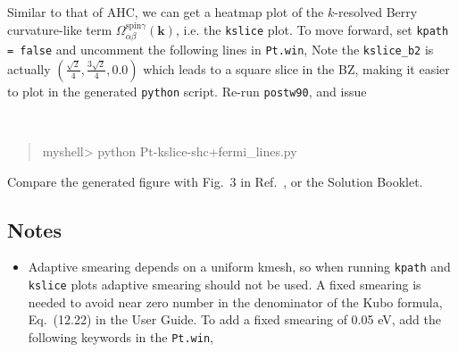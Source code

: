 \documentclass[a4paper,11pt,twoside]{article}
\begin{document}
Similar to that of AHC, we can get a heatmap plot of 
the $k$-resolved Berry curvature-like term 
$\Omega_{\alpha\beta}^{\text{spin}\gamma}({\bm k})$, 
i.e. the {\tt kslice} plot. To move forward, 
set {\tt kpath = false} and uncomment the following lines in {\tt Pt.win},
%
Note the {\tt kslice\_b2} is actually $(\frac{\sqrt{2}}{4},   \frac{3\sqrt{2}}{4},0.0)$ which leads to a square slice in the BZ, 
making it easier to plot in the generated {\tt python} script. 
Re-run {\tt postw90}, and issue%
{\tt
	\begin{quote}
		myshell> python Pt-kslice-shc+fermi\_lines.py
\end{quote} }
\medskip
%
Compare the generated figure with Fig.~3 in Ref.~\cite{qiao-prb2018}, or 
the Solution Booklet. 

\subsection*{Notes}
%
\begin{itemize}
\item Adaptive smearing depends on a uniform kmesh, so when running 
{\tt kpath} and {\tt kslice} plots adaptive smearing should not be 
used. A fixed smearing is needed to avoid 
near zero number in the denominator of the Kubo formula, 
Eq.~(12.22) in the User Guide. To add a fixed smearing of 
0.05 eV, add the following keywords in the {\tt Pt.win}, 
\end{itemize}
\end{document}
